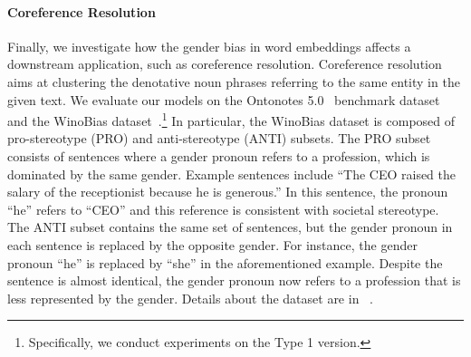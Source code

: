 \paragraph{Coreference Resolution} Finally, we investigate how the gender bias in word embeddings affects a downstream application, such as coreference resolution.
Coreference resolution aims at clustering the denotative noun phrases referring to the same entity in the given text. We evaluate our models on the Ontonotes 5.0~\cite{weischedel2012ontonotes} benchmark dataset and the WinoBias dataset~\cite{zhao2018gender}.\footnote{Specifically, we conduct experiments on the Type 1 version. } In particular, the WinoBias dataset is composed of pro-stereotype (PRO) and anti-stereotype (ANTI) subsets. 
 The PRO subset consists of sentences where a gender pronoun refers to a profession, which is dominated by the same gender.
 Example sentences include ``The CEO raised the salary of the receptionist because he is generous.'' In this sentence, the pronoun ``he'' refers to ``CEO'' and this reference is consistent with societal stereotype. The ANTI subset contains the same set of sentences, but the gender pronoun in each sentence is replaced by the opposite gender. For instance, the gender pronoun ``he'' is replaced by ``she'' in the aforementioned example. Despite the sentence is almost identical, the gender pronoun now refers to a profession that is less represented by the gender.  Details about the dataset are in ~\cite{zhao2018gender}.

